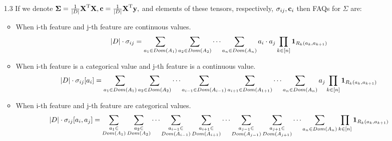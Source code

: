 \documentclass[10pt,a4paper]{article}
\begin{document}
\begin{enumerate}
\item[1.3]
If we denote $\mathbf{\Sigma} = \frac{1}{|D|}\textbf{\text{{X}}} ^ \text{T} \textbf{\text{{X}}}, \textbf{\text{{c}}} = \frac{1}{|D|}\textbf{\text{{X}}} ^ \text{T}\textbf{\text{{y}}}, $
and elements of these tensors, respectively, $\mathbf{\sigma}_{ij}, \textbf{\text{{c}}}_{i}$ then FAQs for $\Sigma$ are: 
\begin{itemize}
\item When i-th feature and j-th feature are continuous values. 
$$|D| \cdot \mathbf{\sigma}_{ij}= \sum_{a_1 \in Dom(A_1)} \sum_{a_2 \in Dom(A_2)} \cdots \sum_{a_n \in Dom(A_n)} a_i \cdot a_j 
\prod_{k\in[n]} \textbf{\text{{1}}}_{R_k(a_k, a_{k+1})}$$
\item When i-th feature is a categorical value and j-th feature is a continuous value. 
$$|D| \cdot \mathbf{\sigma}_{ij}[a_i]= \sum_{a_1 \in Dom(A_1)} \sum_{a_2 \in Dom(A_2)} \cdots 
\sum_{a_{i-1} \in Dom(A_{i-1})}
\sum_{a_{i+1} \in Dom(A_{1+1})}
\cdots
\sum_{a_n \in Dom(A_n)}  a_j 
\prod_{k\in[n]} \textbf{\text{{1}}}_{R_k(a_k, a_{k+1})}$$
\item When i-th feature and j-th feature are categorical values. 
$$|D| \cdot \mathbf{\sigma}_{ij}[a_i, a_j]= 
\sum_{\substack{a_{1} \in \\Dom(A_{1})}}
\sum_{\substack{a_{2} \in \\Dom(A_{2})}}
\cdots 
\sum_{\substack{a_{i-1} \in \\Dom(A_{i-1})}}
\sum_{\substack{a_{i+1} \in \\Dom(A_{i+1})}}
\cdots
\sum_{\substack{a_{j-1} \in \\Dom(A_{j-1})}}
\sum_{\substack{a_{j+1} \in \\Dom(A_{j+1})}}
\cdots
\sum_{a_n \in Dom(A_n)}  
\prod_{k\in[n]} \textbf{\text{{1}}}_{R_k(a_k, a_{k+1})}$$


\end{itemize}
\end{enumerate}
\end{document}
